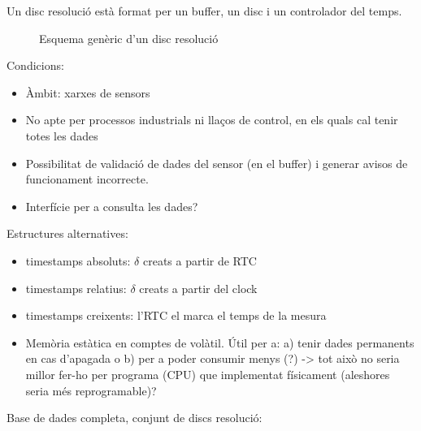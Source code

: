Un disc resolució està format per un buffer, un disc i un controlador del temps.


\begin{figure}[htp]
\centering

\caption{Esquema genèric d'un disc resolució}
\label{fig:vhdl:disc-resolucio}
\end{figure}


Condicions:
\begin{itemize}
\item Àmbit: xarxes de sensors
\item No apte per processos industrials ni llaços de control, en els
  quals cal tenir totes les dades
\item Possibilitat de validació de dades del sensor (en el buffer) i
  generar avisos de funcionament incorrecte.
\item Interfície per a consulta les dades?
\end{itemize}





Estructures alternatives:
\begin{itemize}
\item timestamps absoluts: $\delta$ creats a partir de RTC
\item timestamps relatius: $\delta$ creats a partir del clock
\item timestamps creixents: l'RTC el marca el temps de la mesura
\item Memòria estàtica en comptes de volàtil. Útil per a: a) tenir dades permanents en cas d'apagada o b) per a poder consumir menys (?)   ->  tot això no seria millor fer-ho per programa (CPU) que implementat físicament (aleshores seria més reprogramable)?
\end{itemize}





Base de dades completa, conjunt de discs resolució:
\usetikzlibrary{shapes,arrows,positioning}

